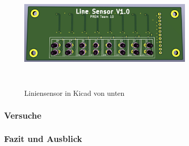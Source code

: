 \documentclass{article}
\begin{document}
\begin{figure}[H]
    \centering
    \includegraphics[width=0.75\textwidth]{Liniensensor_Bottom.pdf}
    \caption{Liniensensor in Kicad von unten}~\label{fig:Liniensensor_Bottom}
\end{figure}


\subsubsection{Versuche}

\subsubsection{Fazit und Ausblick}

\end{document}
